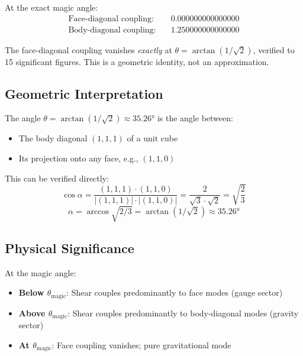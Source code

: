 \documentclass[12pt,a4paper]{article}
\begin{document}
At the exact magic angle:
\begin{align}
\text{Face-diagonal coupling:} \quad &0.000000000000000 \\
\text{Body-diagonal coupling:} \quad &1.250000000000000
\end{align}

\begin{keyresult}
The face-diagonal coupling vanishes \emph{exactly} at $\theta = \arctan(1/\sqrt{2})$, verified to 15 significant figures. This is a geometric identity, not an approximation.
\end{keyresult}

\subsection{Geometric Interpretation}

The angle $\theta = \arctan(1/\sqrt{2}) \approx 35.26°$ is the angle between:
\begin{itemize}
    \item The body diagonal $(1,1,1)$ of a unit cube
    \item Its projection onto any face, e.g., $(1,1,0)$
\end{itemize}

This can be verified directly:
\begin{equation}
\cos\alpha = \frac{(1,1,1) \cdot (1,1,0)}{|(1,1,1)| \cdot |(1,1,0)|} = \frac{2}{\sqrt{3} \cdot \sqrt{2}} = \sqrt{\frac{2}{3}}
\end{equation}
\begin{equation}
\alpha = \arccos\sqrt{2/3} = \arctan(1/\sqrt{2}) \approx 35.26°
\end{equation}

\subsection{Physical Significance}

At the magic angle:
\begin{itemize}
    \item \textbf{Below $\theta_{\text{magic}}$}: Shear couples predominantly to face modes (gauge sector)
    \item \textbf{Above $\theta_{\text{magic}}$}: Shear couples predominantly to body-diagonal modes (gravity sector)
    \item \textbf{At $\theta_{\text{magic}}$}: Face coupling vanishes; pure gravitational mode
\end{itemize}
\end{document}

